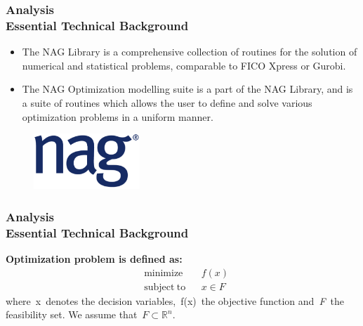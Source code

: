\documentclass[ucs,10pt]{beamer}
\begin{document}
\begin{frame}
\frametitle{Analysis \\
\small \color{rwth-blue} Essential Technical Background}
\begin{itemize}
\item The NAG Library is a comprehensive collection of routines for the solution of numerical and statistical problems, comparable to FICO Xpress or Gurobi.
\item The NAG Optimization modelling suite is a part of the NAG Library, and is a suite of routines which allows the user to define and solve various optimization problems in a uniform manner.
\end{itemize}
\vspace{1em}
\begin{figure}
	\includegraphics[width=4cm]{naglogo.png}
\end{figure}
\end{frame}


\begin{frame}
\frametitle{Analysis \\
\small \color{rwth-blue} Essential Technical Background}
\textbf{Optimization problem is defined as: }
$${\displaystyle {\begin{aligned}
&{\operatorname{minimize}} &&f(x)\\ &{\operatorname{subject\; to}}&& \mathit x \in \mathit{F}\end{aligned}}}$$ 
where x denotes the decision variables, f(x) the objective function and \textit{F} the feasibility set. We assume that $\mathit{F} \subset \mathbb{R}^n$. 

\end{frame}
\end{document}
